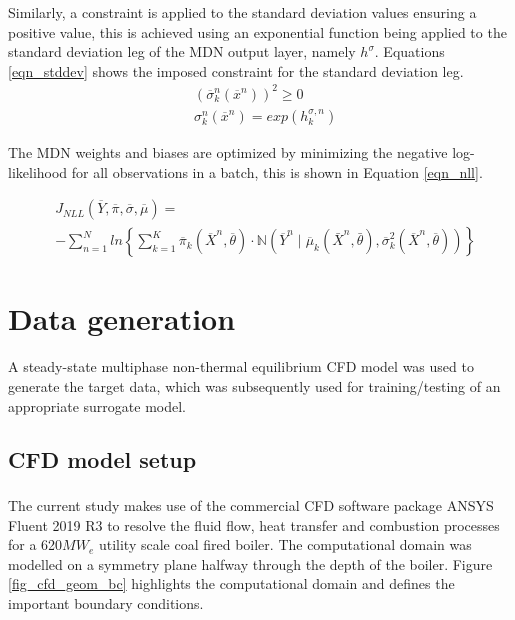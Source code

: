 \documentclass[a4paper,fleqn]{cas-dc}
\begin{document}
Similarly, a constraint is applied to the standard deviation values ensuring a positive value, this is achieved using an exponential function being applied to the standard deviation leg of the MDN output layer, namely $h^{\sigma}$. Equations \ref{eqn_stddev} shows the imposed constraint for the standard deviation leg.\\
\begin{equation}\label{eqn_stddev}
\begin{split}
&(\overline{\sigma}^n_k(\overline{x}^n))^2\geq 0\\
&\sigma_k^n(\overline{x}^n)=exp(h_k^{\sigma,n})
\end{split}
\end{equation}

The MDN weights and biases are optimized by minimizing the negative log-likelihood for all observations in a batch, this is shown in Equation \ref{eqn_nll}.

\begin{equation}\label{eqn_nll}
\begin{split}
&J_{NLL}(\overline{Y},\overline{\pi},\overline{\sigma},\overline{\mu})=\\
&-\sum^N_{n=1}ln\left\{\sum^K_{k=1}\overline{\pi}_k(\overline{X}^n,\overline{\theta})\cdot \mathbb{N}(\overline{Y}^n\mid\overline{\mu}_k(\bar{X}^n,\bar{\theta}),\overline{\sigma}^2_k(\overline{X}^n,\overline{\theta})) \right\}
\end{split}
\end{equation}

\section{Data generation}
A steady-state multiphase non-thermal equilibrium CFD model was used to generate the target data, which was subsequently used for training/testing of an appropriate surrogate model.

\subsection{CFD model setup}
The current study makes use of the commercial CFD software package ANSYS\textsuperscript{\textregistered} Fluent 2019 R3 to resolve the fluid flow, heat transfer and combustion processes for a 620$MW_e$ utility scale coal fired boiler. The computational domain was modelled on a symmetry plane halfway through the depth of the boiler. Figure \ref{fig_cfd_geom_bc} highlights the computational domain and defines the important boundary conditions.\\ 
\end{document}
